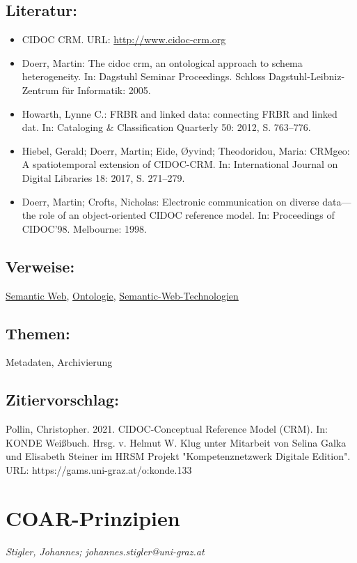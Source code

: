 \documentclass{article}
\begin{document}
        \subsection*{Literatur:}\begin{itemize}\item CIDOC CRM. URL: \url{http://www.cidoc-crm.org}\item Doerr, Martin: The cidoc crm, an ontological approach to schema heterogeneity. In: Dagstuhl Seminar Proceedings. Schloss Dagstuhl-Leibniz-Zentrum für Informatik: 2005.\item Howarth, Lynne C.: FRBR and linked data: connecting FRBR and linked dat. In: Cataloging & Classification Quarterly 50: 2012, S. 763–776.\item Hiebel, Gerald; Doerr, Martin; Eide, Øyvind; Theodoridou, Maria: CRMgeo: A spatiotemporal extension of CIDOC-CRM. In: International Journal on Digital Libraries 18: 2017, S. 271–279.\item Doerr, Martin; Crofts, Nicholas: Electronic communication on diverse data—the role of an object-oriented CIDOC reference model. In: Proceedings of CIDOC’98. Melbourne: 1998.\end{itemize}\subsection*{Verweise:}\href{https://gams.uni-graz.at/o:konde.167}{Semantic Web}, \href{https://gams.uni-graz.at/o:konde.151}{Ontologie}, \href{https://gams.uni-graz.at/o:konde.168}{Semantic-Web-Technologien}\subsection*{Themen:}Metadaten, Archivierung\subsection*{Zitiervorschlag:}Pollin, Christopher. 2021. CIDOC-Conceptual Reference Model (CRM). In: KONDE Weißbuch. Hrsg. v. Helmut W. Klug unter Mitarbeit von Selina Galka und Elisabeth Steiner im HRSM Projekt "Kompetenznetzwerk Digitale Edition". URL: https://gams.uni-graz.at/o:konde.133\newpage\section*{COAR-Prinzipien} \emph{Stigler, Johannes; johannes.stigler@uni-graz.at }\\
        
\end{document}
